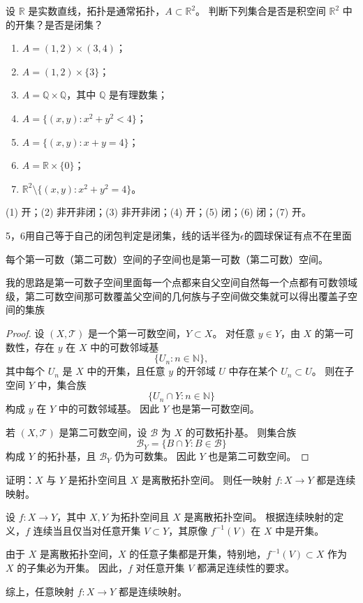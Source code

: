 \begin{homework}[13]
设 $\mathbb{R}$ 是实数直线，拓扑是通常拓扑，$A\subset \mathbb{R}^2$。  
判断下列集合是否是积空间 $\mathbb{R}^2$ 中的开集？是否是闭集？
\begin{enumerate}[(1)]
  \item $A = (1,2)\times(3,4)$；
  \item $A = (1,2)\times\{3\}$；
  \item $A = \mathbb{Q}\times\mathbb{Q}$，其中 $\mathbb{Q}$ 是有理数集；
  \item $A = \{(x,y): x^2+y^2<4\}$；
  \item $A = \{(x,y): x+y=4\}$；
  \item $A = \mathbb{R}\times\{0\}$；
  \item $\mathbb{R}^2\setminus\{(x,y):x^2+y^2=4\}$。
\end{enumerate}
\end{homework}
\begin{solution}
(1) 开；(2) 非开非闭；(3) 非开非闭；(4) 开；(5) 闭；(6) 闭；(7) 开。
\end{solution}
5，6用自己等于自己的闭包判定是闭集，线的话半径为$\epsilon$的圆球保证有点不在里面
\begin{homework}[2.2]
每个第一可数（第二可数）空间的子空间也是第一可数（第二可数）空间。
\end{homework}
我的思路是第一可数子空间里面每一个点都来自父空间自然每一个点都有可数领域级，第二可数空间那可数覆盖父空间的几何族与子空间做交集就可以得出覆盖子空间的集族
\begin{proof}
设 $(X,\mathcal{T})$ 是一个第一可数空间，$Y\subset X$。  
对任意 $y\in Y$，由 $X$ 的第一可数性，存在 $y$ 在 $X$ 中的可数邻域基
\[
\{U_n : n\in\mathbb{N}\},
\]
其中每个 $U_n$ 是 $X$ 中的开集，且任意 $y$ 的开邻域 $U$ 中存在某个 $U_n\subset U$。  
则在子空间 $Y$ 中，集合族
\[
\{U_n\cap Y : n\in\mathbb{N}\}
\]
构成 $y$ 在 $Y$ 中的可数邻域基。  
因此 $Y$ 也是第一可数空间。

若 $(X,\mathcal{T})$ 是第二可数空间，设 $\mathcal{B}$ 为 $X$ 的可数拓扑基。  
则集合族
\[
\mathcal{B}_Y=\{B\cap Y : B\in\mathcal{B}\}
\]
构成 $Y$ 的拓扑基，且 $\mathcal{B}_Y$ 仍为可数集。  
因此 $Y$ 也是第二可数空间。
\end{proof}
\begin{homework}[1]
证明：\(X\) 与 \(Y\) 是拓扑空间且 \(X\) 是离散拓扑空间。  
则任一映射 \(f:X\to Y\) 都是连续映射。
\end{homework}
\begin{solution}
设 $f: X \to Y$，其中 $X, Y$ 为拓扑空间且 $X$ 是离散拓扑空间。  
根据连续映射的定义，$f$ 连续当且仅当对任意开集 $V \subset Y$，其原像 $f^{-1}(V)$ 在 $X$ 中是开集。  

由于 $X$ 是离散拓扑空间，$X$ 的任意子集都是开集，特别地，$f^{-1}(V) \subset X$ 作为 $X$ 的子集必为开集。  
因此，$f$ 对任意开集 $V$ 都满足连续性的要求。  

综上，任意映射 $f: X \to Y$ 都是连续映射。
\end{solution}
